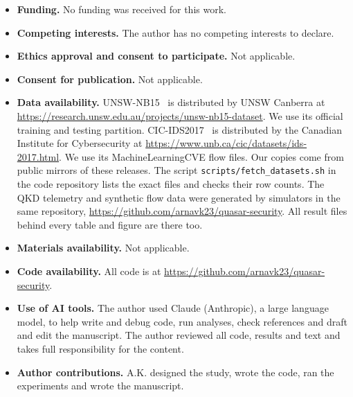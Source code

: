 \documentclass[pdflatex,sn-mathphys-num,lineno]{sn-jnl}
\theoremstyle{thmstyleone}
\begin{document}
\begin{itemize}
\item \textbf{Funding.} No funding was received for this work.
\item \textbf{Competing interests.} The author has no competing interests to declare.
\item \textbf{Ethics approval and consent to participate.} Not applicable.
\item \textbf{Consent for publication.} Not applicable.
\item \textbf{Data availability.} UNSW-NB15~\cite{moustafa2015unsw} is distributed by
  UNSW Canberra at \url{https://research.unsw.edu.au/projects/unsw-nb15-dataset}. We use
  its official training and testing partition. CIC-IDS2017~\cite{sharafaldin2018toward}
  is distributed by the Canadian Institute for Cybersecurity at
  \url{https://www.unb.ca/cic/datasets/ids-2017.html}. We use its MachineLearningCVE flow
  files. Our copies come from public mirrors of these releases. The script
  \texttt{scripts/fetch\_datasets.sh} in the code repository lists the exact files and
  checks their row counts. The QKD telemetry and synthetic flow data were generated by
  simulators in the same repository, \url{https://github.com/arnavk23/quasar-security}.
  All result files behind every table and figure are there too.
\item \textbf{Materials availability.} Not applicable.
\item \textbf{Code availability.} All code is at
  \url{https://github.com/arnavk23/quasar-security}.
\item \textbf{Use of AI tools.} The author used Claude (Anthropic), a large language
  model, to help write and debug code, run analyses, check references and draft and
  edit the manuscript. The author reviewed all code, results and text and takes full
  responsibility for the content.
\item \textbf{Author contributions.} A.K. designed the study, wrote the code, ran the
  experiments and wrote the manuscript.
\end{itemize}


\end{document}
